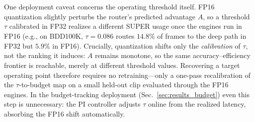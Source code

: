 One deployment caveat concerns the operating threshold itself.
FP16 quantization slightly perturbs the router's predicted advantage $\hat{A}$, so a threshold $\tau$ calibrated in FP32 realizes a different SUPER usage once the engines run in FP16 (e.g., on BDD100K, $\tau{=}0.086$ routes $14.8\%$ of frames to the deep path in FP32 but $5.9\%$ in FP16).
Crucially, quantization shifts only the \emph{calibration} of $\tau$, not the ranking it induces: $\hat{A}$ remains monotone, so the same accuracy--efficiency frontier is reachable, merely at different threshold values.
Recovering a target operating point therefore requires no retraining---only a one-pass recalibration of the $\tau$-to-budget map on a small held-out clip evaluated through the FP16 engines.
In the budget-tracking deployment (Sec.~\ref{sec:results_budget}) even this step is unnecessary: the PI controller adjusts $\tau$ online from the realized latency, absorbing the FP16 shift automatically.


